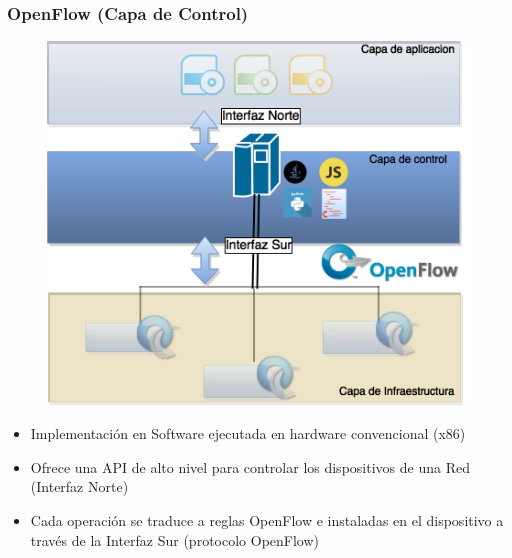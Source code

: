 \documentclass{beamer}
\begin{document}
\begin{frame}
\frametitle{OpenFlow (Capa de Control)} 
\begin{minipage}{0.40\textwidth}
	\begin{figure}[H]
		\centering
		\includegraphics[width=1.0\textwidth]{imagenes/openflowController.png}
	\end{figure}

\end{minipage}
\hfill
\begin{minipage}{0.58\textwidth}
\begin{itemize}
\item Implementaci\'on en Software ejecutada en hardware convencional (x86)
\item Ofrece una API de alto nivel para controlar los dispositivos de una Red (Interfaz Norte)
\item Cada operaci\'on se traduce a reglas OpenFlow e instaladas en el dispositivo a trav\'es de la Interfaz Sur (protocolo OpenFlow)
\end{itemize}

\end{minipage}
\end{frame}
\end{document}

